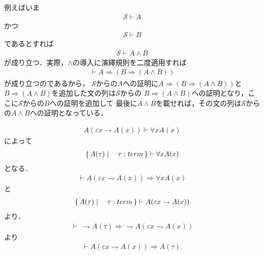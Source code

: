 	例えばいま
	\begin{align}
		\mathscr{S} \vdash A
	\end{align}
	かつ
	\begin{align}
		\mathscr{S} \vdash B
	\end{align}
	であるとすれば
	\begin{align}
		\mathscr{S} \vdash A \wedge B
	\end{align}
	が成り立つ．実際，$\wedge$の導入に演繹規則を二度適用すれば
	\begin{align}
		\vdash A \Longrightarrow (B \Longrightarrow (A \wedge B))
	\end{align}
	が成り立つのであるから，
	$\mathscr{S}$からの$A$への証明に$A \Longrightarrow (B \Longrightarrow (A \wedge B))$と
	$B \Longrightarrow (A \wedge B)$を追加した文の列は$\mathscr{S}$からの
	$B \Longrightarrow (A \wedge B)$への証明となり，ここに$\mathscr{S}$からの$B$への証明を追加して
	最後に$A \wedge B$を載せれば，その文の列は$\mathscr{S}$からの$A \wedge B$への証明となっている．
	
	
	
	\begin{align}
		A(\varepsilon x \rightharpoondown A(x)) \vdash \forall x A(x)
	\end{align}
	によって
	\begin{align}
		\left\{\, A(\tau) \mid \quad \tau:term\, \right\} \vdash \forall x A(x)
	\end{align}
	となる．
	\begin{align}
		\vdash A(\varepsilon x \rightharpoondown A(x)) \Longrightarrow \forall x A(x)
	\end{align}
	と
	\begin{align}
		\left\{\, A(\tau) \mid \quad \tau:term\, \right\} \vdash A(\varepsilon x \rightharpoondown A(x))
	\end{align}
	より．
	\begin{align}
		\vdash\ \rightharpoondown A(\tau) \Longrightarrow \rightharpoondown A(\varepsilon x \rightharpoondown A(x))
	\end{align}
	より
	\begin{align}
		\vdash A(\varepsilon x \rightharpoondown A(x)) \Longrightarrow A(\tau).
	\end{align}